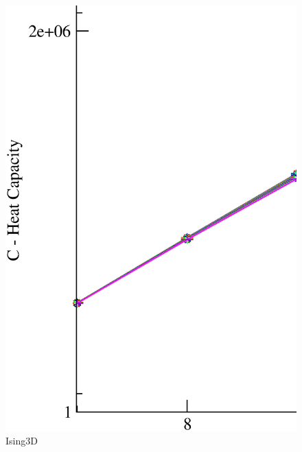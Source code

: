 \begin{figure}[!htpb]
  \centering
  \includegraphics[width=15cm]{./plots/Ising3D/Ising3D_HeatCapacity_vs_L.eps}
  \caption{Ising3D}
\end{figure}

